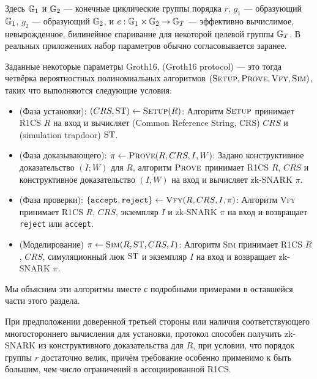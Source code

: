 Здесь $\mathbb{G}_1$ и $\mathbb{G}_2$ --- конечные циклические группы порядка $r$, $g_1$ --- образующий $\mathbb{G}_1$, $g_2$ --- образующий $\mathbb{G}_2$, и $e: \mathbb{G}_1 \times \mathbb{G}_2 \to \mathbb{G}_T$ --- эффективно вычислимое, невырожденное, билинейное спаривание для некоторой целевой группы $\mathbb{G}_T$. В реальных приложениях набор параметров обычно согласовывается заранее.

Заданные некоторые параметры Groth16,  (Groth16 protocol) --- это тогда четвёрка вероятностных полиномиальных алгоритмов $(\textsc{Setup},\textsc{Prove},\textsc{Vfy},\textsc{Sim})$, таких что выполняются следующие условия:
\begin{itemize}
\item (Фаза установки): $(CRS,\mathrm{ST})\leftarrow \textsc{Setup}(R)$: Алгоритм $\textsc{Setup}$ принимает R1CS $R$ на вход и вычисляет  (Common Reference String, CRS) $CRS$ и  (simulation trapdoor) $\mathrm{ST}$.
\item (Фаза доказывающего): $\pi\leftarrow \textsc{Prove}(R,CRS,I,W)$: Задано конструктивное доказательство $(I;W)$ для $R$, алгоритм $\textsc{Prove}$ принимает R1CS $R$,  $CRS$ и конструктивное доказательство $(I,W)$ на вход и вычисляет zk-SNARK $\pi$.
\item (Фаза проверки): $\{\mathtt{accept},\mathtt{reject}\}\leftarrow \textsc{Vfy}(R,CRS,I,\pi)$: Алгоритм \textsc{Vfy} принимает R1CS $R$,  $CRS$, экземпляр $I$ и zk-SNARK $\pi$ на вход и возвращает \texttt{reject} или \texttt{accept}.
\item (Моделирование) $\pi\leftarrow \textsc{Sim}(R,\mathrm{ST},CRS, I)$: Алгоритм \textsc{Sim} принимает R1CS $R$,  $CRS$, симуляционный люк $\mathrm{ST}$ и экземпляр $I$ на вход и возвращает zk-SNARK $\pi$.
\end{itemize}
Мы объясним эти алгоритмы вместе с подробными примерами в оставшейся части этого раздела.

При предположении доверенной третьей стороны или наличия соответствующего многостороннего вычисления для установки, протокол способен получить zk-SNARK из конструктивного доказательства для $R$, при условии, что порядок группы $r$ достаточно велик, причём требование особенно применимо к быть большим, чем число ограничений в ассоциированной R1CS.


